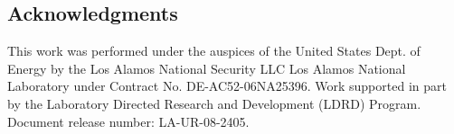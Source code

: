 \documentclass[journal,twoside]{IEEEtran}
\begin{document}
\subsection*{Acknowledgments}

This work was performed under the auspices of the United States Dept.
of Energy by the Los Alamos National Security LLC Los Alamos National
Laboratory under Contract No. DE-AC52-06NA25396.  Work supported in
part by the Laboratory Directed Research and Development (LDRD)
Program.  Document release number: LA-UR-08-2405.









\end{document}

